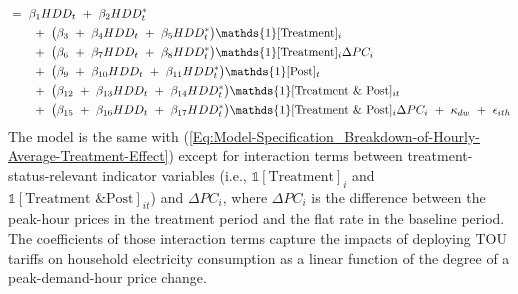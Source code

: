 \begin{equation}
\begin{split}
    & = \ \beta_{1} HDD_{t} \ + \ \beta_{2} HDD_{t}^{*} \\
    & \hspace{0.7cm} + \ \big( \beta_{3} \ + \ \beta_{4} HDD_{t} \ + \ \beta_{5} HDD_{t}^{*} \big) \mathds{1}[\text{Treatment}]_{i} \\
    & \hspace{0.7cm} + \ \big( \beta_{6} \ + \ \beta_{7} HDD_{t} \ + \ \beta_{8} HDD_{t}^{*} \big) \mathds{1}[\text{Treatment}]_{i} \Delta PC_{i} \\
    & \hspace{0.7cm} + \ \big( \beta_{9} \ + \ \beta_{10} HDD_{t} \ + \ \beta_{11} HDD_{t}^{*} \big) \mathds{1}[\text{Post}]_{t} \\
    & \hspace{0.7cm} + \ \big( \beta_{12} \ + \ \beta_{13} HDD_{t} \ + \ \beta_{14} HDD_{t}^{*} \big) \mathds{1}[\text{Treatment \& Post}]_{it} \\
    & \hspace{0.7cm} + \ \big( \beta_{15} \ + \ \beta_{16} HDD_{t} \ + \ \beta_{17} HDD_{t}^{*} \big) \mathds{1}[\text{Treatment \& Post}]_{i} \Delta PC_{i} \ + \ \kappa_{dw} \ + \ \epsilon_{ith}
\end{split}
\end{equation}
The model is the same with (\ref{Eq:Model-Specification_Breakdown-of-Hourly-Average-Treatment-Effect}) except for interaction terms between treatment-status-relevant indicator variables (i.e., $\mathds{1}[\text{Treatment}]_{i}$ and $\mathds{1}[\text{Treatment \& Post}]_{it}$) and $\Delta PC_{i}$, where $\Delta PC_{i}$ is the difference between the peak-hour prices in the treatment period and the flat rate in the baseline period. The coefficients of those interaction terms capture the impacts of deploying TOU tariffs on household electricity consumption as a linear function of the degree of a peak-demand-hour price change.

